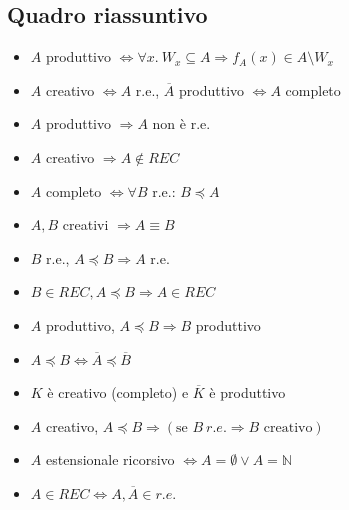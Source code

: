 \documentclass[a4paper]{article}
\begin{document}
	\subsection{Quadro riassuntivo}
	\begin{itemize}
		\item $A$ produttivo $\iff \forall x. \: W_{x} \subseteq A \Longrightarrow f_{A}\left(x\right) \in A \setminus W_{x}$
		
		\item $A$ creativo $\iff A$ r.e., $\overline{A}$ produttivo $\iff A$ completo
		
		\item $A$ produttivo $\Longrightarrow A$ non è r.e.
		
		\item $A$ creativo $\Longrightarrow A \notin REC$
		
		\item $A$ completo $\iff \forall B$ r.e.: $B \preceq A$
		
		\item $A,B$ creativi $\Longrightarrow A \equiv B$
		
		\item $B$ r.e., $A \preceq B \Longrightarrow A$ r.e.
		
		\item $B \in REC, A \preceq B \Longrightarrow A \in REC$
		
		\item $A$ produttivo, $A \preceq B \Longrightarrow B$ produttivo
		
		\item $A \preceq B \iff \overline{A} \preceq \overline{B}$
		
		\item $K$ è creativo (completo) e $\overline{K}$ è produttivo
		
		\item $A$ creativo, $A \preceq B \Longrightarrow \left(\text{se } B \: r.e. \Longrightarrow B \text{ creativo}\right)$
		
		\item $A$ estensionale ricorsivo $\iff A = \emptyset \lor A = \mathbb{N}$
		
		\item $A \in REC \iff A,\overline{A} \in r.e.$ 
	\end{itemize}
\end{document}
